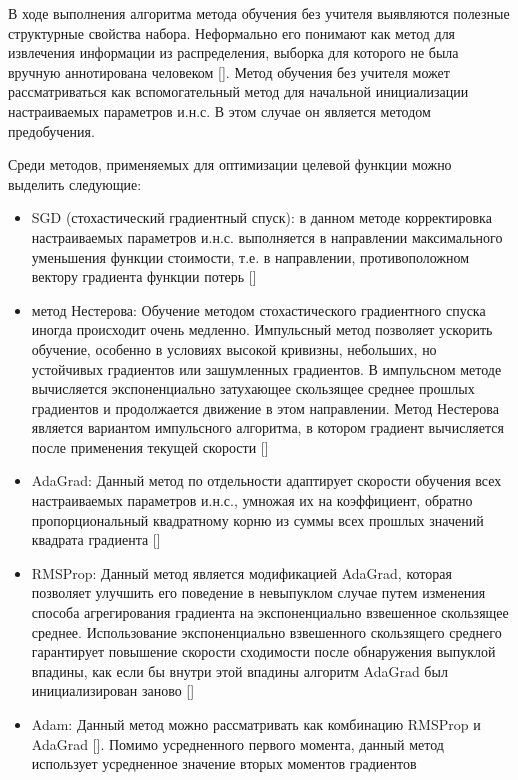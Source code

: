 В ходе выполнения алгоритма метода обучения без учителя выявляются полезные структурные свойства
набора. Неформально его понимают как метод для извлечения информации из распределения, выборка для которого
не была вручную аннотирована человеком []. Метод обучения без учителя может рассматриваться как вспомогательный метод для начальной инициализации настраиваемых параметров и.н.с. В этом случае он является методом предобучения.

Среди методов, применяемых для оптимизации целевой функции можно выделить следующие:

\begin{itemize}
	\item SGD (стохастический градиентный спуск): в данном методе корректировка настраиваемых параметров и.н.с. выполняется в направлении максимального уменьшения функции стоимости, т.е. в направлении, противоположном вектору градиента функции потерь []
	\item метод Нестерова: Обучение методом стохастического градиентного спуска иногда происходит очень медленно. Импульсный метод позволяет ускорить обучение, особенно в условиях высокой кривизны, небольших, но устойчивых градиентов или зашумленных градиентов. В импульсном методе вычисляется экспоненциально затухающее скользящее среднее прошлых градиентов и продолжается движение в этом направлении. Метод Нестерова является вариантом импульсного алгоритма, в котором градиент вычисляется после применения текущей скорости []
	\item AdaGrad: Данный метод по отдельности адаптирует скорости обучения всех настраиваемых параметров и.н.с., умножая их на коэффициент, обратно пропорциональный квадратному корню из суммы всех прошлых значений квадрата градиента []
	\item RMSProp: Данный метод является модификацией AdaGrad, которая позволяет улучшить его поведение в невыпуклом случае путем изменения способа агрегирования градиента на экспоненциально взвешенное скользящее среднее. Использование экспоненциально взвешенного скользящего среднего гарантирует повышение скорости сходимости после обнаружения выпуклой впадины, как если бы внутри этой впадины алгоритм AdaGrad был инициализирован заново []
	\item Adam: Данный метод можно рассматривать как комбинацию RMSProp и AdaGrad []. Помимо усредненного первого момента, данный метод использует усредненное значение вторых моментов градиентов
\end{itemize} 

